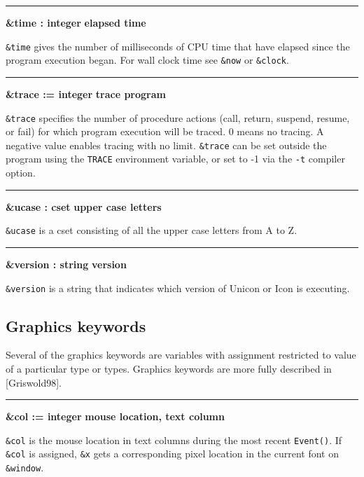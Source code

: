 \bigskip\hrule\vspace{0.1cm}
\noindent
{\bf \&time : integer } \hfill {\bf elapsed time}

\noindent
{}\texttt{\&}\texttt{time}
gives the number of milliseconds of CPU time that have elapsed since
the program execution began. For wall clock time see \texttt{\&now} or
\texttt{\&clock}.

\bigskip\hrule\vspace{0.1cm}
\noindent
{\bf \&trace := integer } \hfill {\bf trace program}

\noindent
\texttt{\&trace} specifies the number of procedure actions
(call, return, suspend, resume, or fail) for which
program execution will be traced. 0 means no tracing.
A negative value enables tracing with no limit.
\texttt{\&trace} can be set outside the program using the \texttt{TRACE}
environment variable, or set to -1 via
the \texttt{{}-t} compiler option.

\bigskip\hrule\vspace{0.1cm}
\noindent
{\bf \&ucase : cset } \hfill {\bf upper case letters}

\noindent
{}\texttt{\&ucase} is a cset consisting of all the upper
case letters from A to Z.

\bigskip\hrule\vspace{0.1cm}
\noindent
{\bf \&version : string } \hfill {\bf version}

\noindent
{}\texttt{\&version} is a string that indicates which
version of Unicon or Icon is executing.

\subsection*{Graphics keywords}

Several of the graphics keywords are variables with assignment
restricted to value of a particular type or types. Graphics keywords
are more fully described in [Griswold98].

\bigskip\hrule\vspace{0.1cm}
\noindent
{\bf \&col := integer } \hfill {\bf mouse location, text column}

\noindent
\texttt{\&col} is the mouse location in text columns during the most
recent \texttt{Event()}. If \texttt{\&col} is assigned, \texttt{\&x}
gets a corresponding pixel location in the current font on
\texttt{\&window}.

